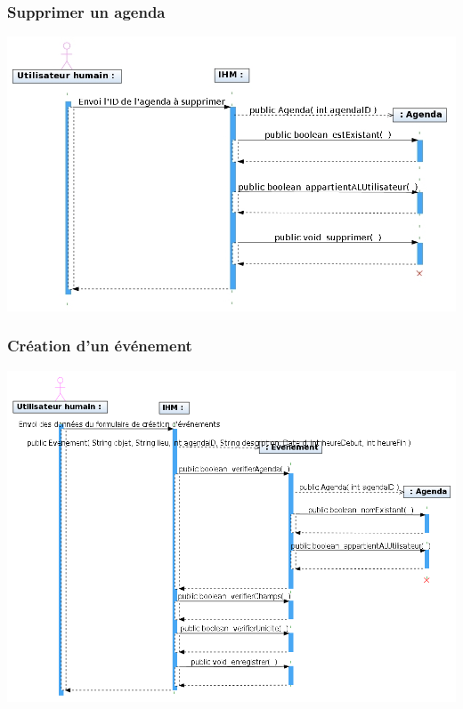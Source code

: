 \documentclass[12pt , a4paper]{article}
\begin{document}
\begin{landscape}
\subsubsection{Supprimer un agenda}
\begin{center}
  \includegraphics[scale=0.55]{./images/diag_seq_supprimer_agenda.jpg}
\end{center}
\end{landscape}

\begin{landscape}
\subsubsection{Création d'un événement}
\begin{center}
  \includegraphics[scale=0.55]{./images/diag_seq_creation_evenement.png}
\end{center}
\end{landscape}
\end{document}

